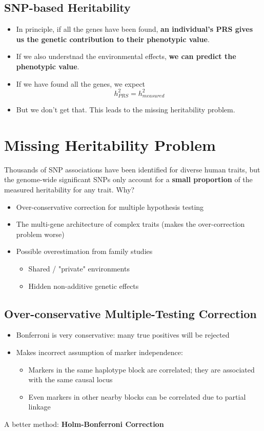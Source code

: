 \documentclass[10pt]{article}
\begin{document}
\subsection*{SNP-based Heritability}
\begin{itemize}
	\item In principle, if all the genes have been found, \textbf{an individual's PRS gives us the genetic contribution to their phenotypic value}.
	\item If we also understnad the environmental effects, \textbf{we can predict the phenotypic value}.
	\item If we have found all the genes, we expect
	\[h_{PRS}^2 = h_{measured}^2\]
    \item But we don't get that.  This leads to the missing heritability problem.
\end{itemize}

\section*{Missing Heritability Problem}
Thousands of SNP associations have been identified for diverse human traits, but the genome-wide significant SNPs only account for a \textbf{small proportion} of the measured heritability for any trait.  Why?
\begin{itemize}
	\item Over-conservative correction for multiple hypothesis testing
	\item The multi-gene architecture of complex traits (makes the over-correction problem worse)
	\item Possible overestimation from family studies
	\begin{itemize}
	    \item Shared / "private" environments
	    \item Hidden non-additive genetic effects
    \end{itemize}
\end{itemize}

\subsection*{Over-conservative Multiple-Testing Correction}
\begin{itemize}
	\item Bonferroni is very conservative: many true positives will be rejected
	\item Makes incorrect assumption of marker independence:
	\begin{itemize}
	    \item Markers in the same haplotype block are correlated; they are associated with the same causal locus
	    \item Even markers in other nearby blocks can be correlated due to partial linkage
    \end{itemize}
\end{itemize}
A better method: \textbf{Holm-Bonferroni Correction}
\end{document}
